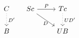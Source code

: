 \begin{figure}[H]
\centering

\[ \begin{array}{cc}
\begin{tikzcd}
	C \arrow[d, dotted, "D'"]\\
	B
\end{tikzcd}

&

\begin{tikzcd}
	Sc \arrow[r, "P"] \arrow[dr, "D" below] & Tc \arrow[d, dotted, "UD'"]\\
								 		   & UB
\end{tikzcd}
\end{array} \]

\end{figure}